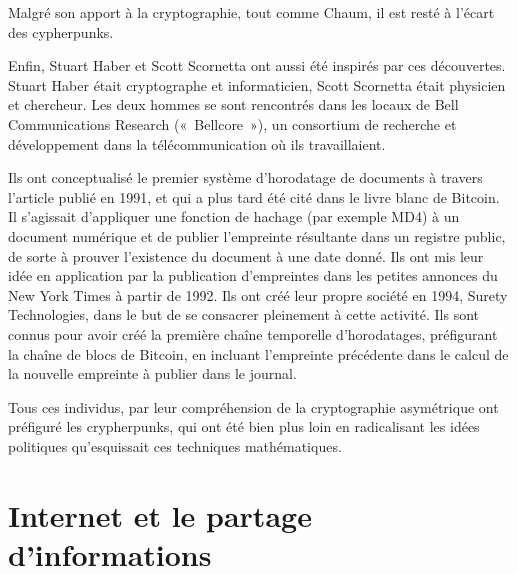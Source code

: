 Malgré son apport à la cryptographie, tout comme Chaum, il est resté à l'écart des cypherpunks.

Enfin, Stuart Haber et Scott Scornetta ont aussi été inspirés par ces découvertes. Stuart Haber était cryptographe et informaticien, Scott Scornetta était physicien et chercheur. Les deux hommes se sont rencontrés dans les locaux de Bell Communications Research («~Bellcore~»), un consortium de recherche et développement dans la télécommunication où ils travaillaient.

Ils ont conceptualisé le premier système d'horodatage de documents à travers l'article  publié en 1991, et qui a plus tard été cité dans le livre blanc de Bitcoin. Il s'agissait d'appliquer une fonction de hachage (par exemple MD4) à un document numérique et de publier l'empreinte résultante dans un registre public, de sorte à prouver l'existence du document à une date donné. Ils ont mis leur idée en application par la publication d'empreintes dans les petites annonces du New York Times à partir de 1992. Ils ont créé leur propre société en 1994, Surety Technologies, dans le but de se consacrer pleinement à cette activité. Ils sont connus pour avoir créé la première chaîne temporelle d'horodatages, préfigurant la chaîne de blocs de Bitcoin, en incluant l'empreinte précédente dans le calcul de la nouvelle empreinte à publier dans le journal.

Tous ces individus, par leur compréhension de la cryptographie asymétrique ont préfiguré les crypherpunks, qui ont été bien plus loin en radicalisant les idées politiques qu'esquissait ces techniques mathématiques.

\section*{Internet et le partage d'informations}


